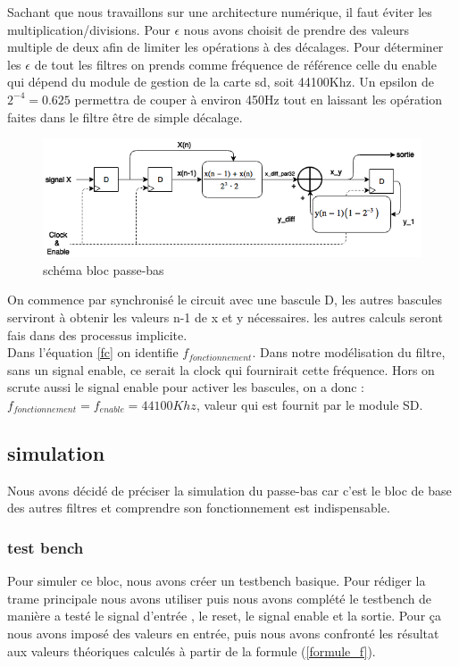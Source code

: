 \documentclass[hidelinks]{article}
\begin{document}
    Sachant que nous travaillons sur une architecture numérique, il faut éviter les multiplication/divisions. Pour $\epsilon$ nous avons choisit de prendre des valeurs multiple de deux afin de limiter les opérations à des décalages.    
    Pour déterminer les $\epsilon$ de tout les filtres on prends comme fréquence de référence celle du enable qui dépend du module de gestion de la carte sd, soit 44100Khz. Un epsilon de $2^{-4}=0.625$ permettra de couper à environ 450Hz tout en laissant les opération faites dans le filtre être de simple décalage.
    \begin{figure}[H]
    	\centering
    	 		\includegraphics[width=12cm,
    	 		keepaspectratio=true]{filtre_passe_bas.PNG}
    	\caption{\label{passe_bas}schéma bloc passe-bas}
    \end{figure}
   	On commence par synchronisé le circuit avec une bascule D, les autres bascules serviront à obtenir les valeurs n-1 de x et y nécessaires. les autres calculs seront fais dans des processus implicite.\\
   	Dans l'équation \ref{fc} on identifie $f_{fonctionnement}$. Dans notre modélisation du filtre, sans un signal enable, ce serait la clock qui fournirait cette fréquence. Hors on scrute aussi le signal enable pour activer les bascules, on a donc :\\$f_{fonctionnement}=f_{enable}=44100Khz$, valeur qui est fournit par le module SD.
   	
    \subsection{simulation}
	Nous avons décidé de préciser la simulation du passe-bas car c'est le bloc de base des autres filtres et comprendre son fonctionnement est indispensable.

    
    \subsubsection{test bench}
    Pour simuler ce bloc, nous avons créer un testbench basique. Pour rédiger la trame principale nous avons utiliser \cite{lapinoo} puis nous avons complété le testbench de manière a testé le signal d'entrée , le reset, le signal enable et la sortie. Pour ça nous avons imposé des valeurs en entrée, puis nous avons confronté les résultat aux valeurs théoriques calculés à partir de la formule (\ref{formule_f}).\\
    
\end{document}
